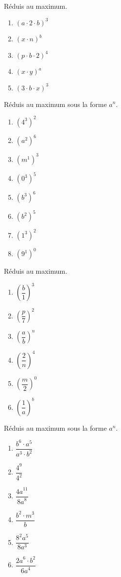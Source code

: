 \documentclass[12pt,parskip=half-, twoside=semi]{scrartcl}
\begin{document}
\begin{exercise}
  Réduis au maximum.
  \begin{enumerate}[cols=5]
    \item \((a \cdot 2 \cdot b)^{3} \)
    \item \((x \cdot n)^{b} \)
    \item \((p \cdot b \cdot 2)^{4} \)
    \item \((x \cdot y)^{a} \)
    \item \((3 \cdot b \cdot x)^{3} \)    
  \end{enumerate}
\end{exercise}

\begin{exercise}
  Réduis au maximum sous la forme $a^n$.
  \begin{enumerate}[cols=6]
    \item \(\left( 4^{3} \right)^{2}\)
    \item \(\left( a^{2} \right)^{6}\)
    \item \(\left( m^{1} \right)^{3}\)
    \item \(\left( 0^{3} \right)^{5}\)
    \item \(\left( b^{3} \right)^{6}\)
    \item \(\left( b^{2} \right)^{5}\)
    \item \(\left( 1^{3} \right)^{2}\)
    \item \(\left( 9^{1} \right)^{0}\)
  \end{enumerate}
\end{exercise}

\begin{exercise}
  Réduis au maximum.
  \begin{enumerate}[cols=6]
    \item \(\left( \dfrac{b}{1} \right)^{3} \)
    \item \(\left( \dfrac{p}{7} \right)^{2} \)
    \item \(\left( \dfrac{a}{b} \right)^{n} \)
    \item \(\left( \dfrac{2}{n} \right)^{4} \)
    \item \(\left( \dfrac{m}{2} \right)^{0} \)
    \item \(\left( \dfrac{1}{a} \right)^{b} \)
  \end{enumerate}
\end{exercise}

\begin{exercise}
  Réduis au maximum sous la forme $a^n$.
  \begin{enumerate}[cols=3]
    \item \(\dfrac{b^{6} \cdot a^{5}}{a^{3} \cdot b^{2}} \)
    \item \(\dfrac{4^{9}}{4^{2}} \)
    \item \(\dfrac{{4a}^{11}}{{8a}^{8}} \)
    \item \(\dfrac{b^{2} \cdot m^{3}}{b} \)
    \item \(\dfrac{8^{2}a^{5}}{8a^{3}} \)
    \item \(\dfrac{{2a}^{6} \cdot b^{2}}{{6a}^{4}} \)
  \end{enumerate}
\end{exercise}
\end{document}
